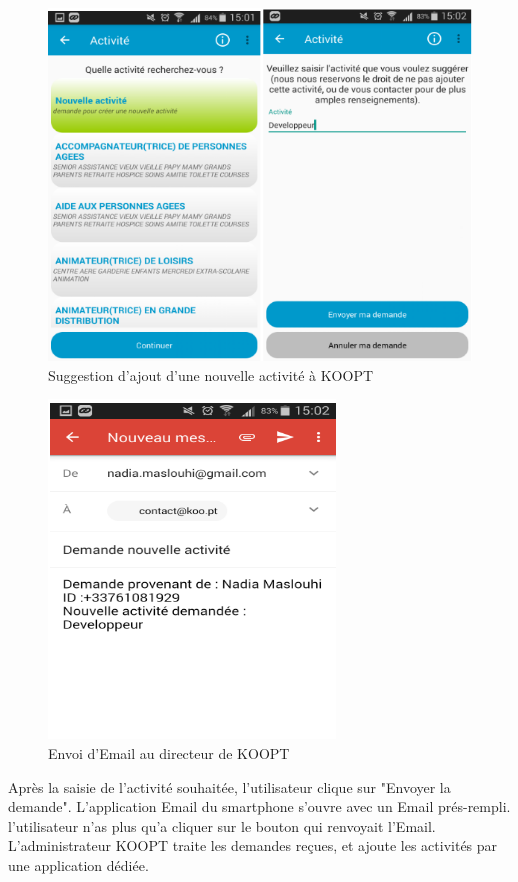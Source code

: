  \begin{figure}[H]
\begin{center}
\includegraphics[width=1\linewidth]{images/newactivite}
\end{center}
\caption{Suggestion d'ajout d'une nouvelle activité à KOOPT}
\label{fig:16}
\end{figure}


 \begin{figure}[H]
\begin{center}
\includegraphics[width=0.5\linewidth]{images/sendmail}
\end{center}
\caption{Envoi d'Email au directeur de KOOPT}
\label{fig:17}
\end{figure}

Après la saisie de l’activité souhaitée, l’utilisateur clique sur "Envoyer la demande". L’application Email du smartphone s'ouvre avec un Email prés-rempli. l'utilisateur n'as plus qu'a cliquer sur le bouton qui renvoyait l'Email.
L'administrateur KOOPT traite les demandes reçues, et ajoute les activités par une application dédiée. 
